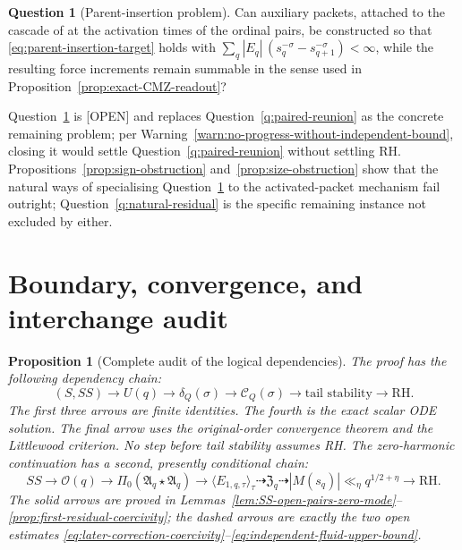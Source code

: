 \documentclass[11pt]{amsart}
\numberwithin{equation}{section}
\theoremstyle{plain}
\newtheorem{proposition}[theorem]{Proposition}
\theoremstyle{definition}
\newtheorem{question}[theorem]{Question}
\theoremstyle{remark}
\newcommand{\RH}{\mathrm{RH}}
\begin{document}
\begin{question}[Parent-insertion problem]
\label{q:parent-insertion}
Can auxiliary packets, attached to the cascade of
\cite{AlpogeBuckmasterCoiculescu2026} at the activation times of the ordinal
pairs, be constructed so that \eqref{eq:parent-insertion-target} holds with
$\sum_q|E_q|\,(s_q^{-\sigma}-s_{q+1}^{-\sigma})<\infty$, while the resulting
force increments remain summable in the sense used in
Proposition~\ref{prop:exact-CMZ-readout}?
\end{question}

Question~\ref{q:parent-insertion} is \textup{[OPEN]} and replaces
Question~\ref{q:paired-reunion} as the concrete remaining problem; per
Warning~\ref{warn:no-progress-without-independent-bound}, closing it would
settle Question~\ref{q:paired-reunion} without settling RH.
Propositions~\ref{prop:sign-obstruction} and~\ref{prop:size-obstruction}
show that the natural ways of specialising
Question~\ref{q:parent-insertion} to the activated-packet mechanism fail
outright; Question~\ref{q:natural-residual} is the specific remaining
instance not excluded by either.

\section{Boundary, convergence, and interchange audit}
\label{sec:audit}

\begin{proposition}[Complete audit of the logical dependencies]
\label{prop:dependency-audit}
The proof has the following dependency chain:
\begin{equation}
(S,SS)\longrightarrow U(q)
\longrightarrow\delta_Q(\sigma)
\longrightarrow\mathscr C_Q(\sigma)
\longrightarrow\text{tail stability}
\longrightarrow\RH.
\label{eq:dependency-chain}
\end{equation}
The first three arrows are finite identities.  The fourth is the exact scalar
ODE solution.  The final arrow uses the original-order convergence theorem
and the Littlewood criterion.  No step before tail stability assumes RH.
The zero-harmonic continuation has a second, presently conditional chain:
\begin{equation}
 SS\longrightarrow\mathcal O(q)
 \longrightarrow\Pi_0(\mathfrak A_q\star\mathfrak A_q)
 \longrightarrow\langle E_{1,q,\tau}\rangle_\tau
 \dashrightarrow\mathfrak Z_q
 \dashrightarrow |M(s_q)|\ll_\eta q^{1/2+\eta}
 \longrightarrow\RH.
\label{eq:zero-harmonic-dependency-chain}
\end{equation}
The solid arrows are proved in
Lemmas~\ref{lem:SS-open-pairs-zero-mode}--\ref{prop:first-residual-coercivity};
the dashed arrows are exactly the two open estimates
\eqref{eq:later-correction-coercivity}--\eqref{eq:independent-fluid-upper-bound}.
\end{proposition}
\end{document}
